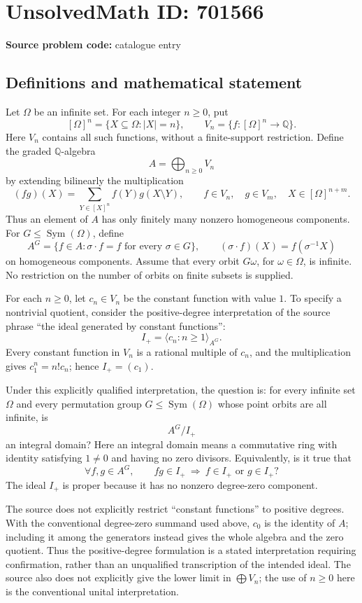 \documentclass[11pt]{article}
\newcommand{\Q}{\mathbb{Q}}
\begin{document}
\section*{UnsolvedMath ID: 701566}
\textbf{Source problem code:} catalogue entry
\subsection{Definitions and mathematical statement}
Let \(\Omega\) be an infinite set. For each integer \(n\geq 0\), put
\[
[\Omega]^n=\{X\subseteq\Omega:|X|=n\},\qquad V_n=\{f:[\Omega]^n\to\Q\}.
\]
Here \(V_n\) contains all such functions, without a finite-support restriction. Define the graded \(\Q\)-algebra
\[
A=\bigoplus_{n\geq0}V_n
\]
by extending bilinearly the multiplication
\[
(fg)(X)=\sum_{Y\in[X]^n}f(Y)g(X\setminus Y),\qquad f\in V_n,\quad g\in V_m,\quad X\in[\Omega]^{n+m}.
\]
Thus an element of \(A\) has only finitely many nonzero homogeneous components. For \(G\leq\operatorname{Sym}(\Omega)\), define
\[
A^G=\{f\in A:\sigma\cdot f=f\text{ for every }\sigma\in G\},\qquad (\sigma\cdot f)(X)=f(\sigma^{-1}X)
\]
on homogeneous components. Assume that every orbit \(G\omega\), for \(\omega\in\Omega\), is infinite. No restriction on the number of orbits on finite subsets is supplied.

For each \(n\geq0\), let \(c_n\in V_n\) be the constant function with value \(1\). To specify a nontrivial quotient, consider the positive-degree interpretation of the source phrase ``the ideal generated by constant functions'':
\[
I_+=\big\langle c_n:n\geq1\big\rangle_{A^G}.
\]
Every constant function in \(V_n\) is a rational multiple of \(c_n\), and the multiplication gives \(c_1^n=n!c_n\); hence \(I_+=(c_1)\).

Under this explicitly qualified interpretation, the question is: for every infinite set \(\Omega\) and every permutation group \(G\leq\operatorname{Sym}(\Omega)\) whose point orbits are all infinite, is
\[
A^G/I_+
\]
an integral domain? Here an integral domain means a commutative ring with identity satisfying \(1\neq0\) and having no zero divisors. Equivalently, is it true that
\[
\forall f,g\in A^G,\qquad fg\in I_+\ \Longrightarrow\ f\in I_+\text{ or }g\in I_+?
\]
The ideal \(I_+\) is proper because it has no nonzero degree-zero component.

The source does not explicitly restrict ``constant functions'' to positive degrees. With the conventional degree-zero summand used above, \(c_0\) is the identity of \(A\); including it among the generators instead gives the whole algebra and the zero quotient. Thus the positive-degree formulation is a stated interpretation requiring confirmation, rather than an unqualified transcription of the intended ideal. The source also does not explicitly give the lower limit in \(\bigoplus V_n\); the use of \(n\geq0\) here is the conventional unital interpretation.
\end{document}
